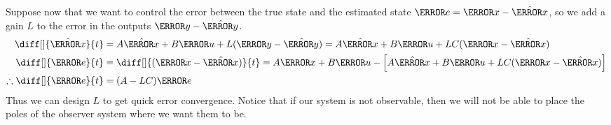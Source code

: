 Suppose now that we want to control the error between the true state and the estimated state $\V{e} = \V{x} - \hat{\V{x}}$, so we add a gain $L$ to the error in the outputs $\V{y}-\hat{\V{y}}$.
\begin{align*}
  \diff[]{\hat{\V{x}}}{t} &= A\hat{\V{x}} + B\V{u} + L(\V{y}-\hat{\V{y}}) = A\hat{\V{x}}+B\V{u}+LC(\V{x}-\hat{\V{x}})\\
  \diff[]{\V{e}}{t} &= \diff[]{(\V{x}-\hat{\V{x}})}{t} = A\V{x}+B\V{u} - \left[A\hat{\V{x}}+B\V{u}+LC(\V{x}-\hat{\V{x}})\right]\\
  \therefore \diff[]{\V{e}}{t} &= (A-LC)\V{e}
\end{align*}
Thus we can design $L$ to get quick error convergence. Notice that if our system is not observable, then we will not be able to place the poles of the observer system where we want them to be.

